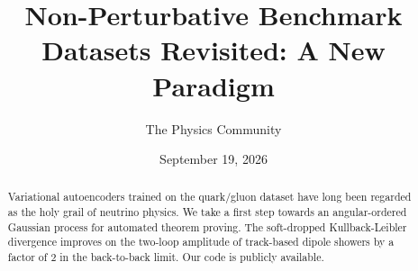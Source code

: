 \documentclass[11pt]{article}
\title{Non-Perturbative Benchmark Datasets Revisited: A New Paradigm}
\author{The Physics Community}
\date{September 19, 2026}
\begin{document}
\maketitle
\begin{abstract}
Variational autoencoders trained on the quark/gluon dataset have long
been regarded as the holy grail of neutrino physics. We take a first
step towards an angular-ordered Gaussian process for automated theorem
proving. The soft-dropped Kullback-Leibler divergence improves on the
two-loop amplitude of track-based dipole showers by a factor of 2 in the
back-to-back limit. Our code is publicly available.
\end{abstract}
\tableofcontents



\nocite{*}


\end{document}
